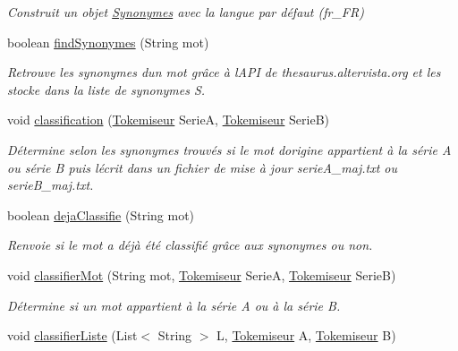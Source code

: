 \begin{DoxyCompactItemize}
\begin{DoxyCompactList}\small\item\em Construit un objet \hyperlink{classsynonymes_1_1_synonymes}{Synonymes} avec la langue par défaut (fr\+\_\+\+FR) \end{DoxyCompactList}\item 
boolean \hyperlink{classsynonymes_1_1_synonymes_aa0cc803aca4798d8bb630a1be78b4383}{find\+Synonymes} (String mot)
\begin{DoxyCompactList}\small\item\em Retrouve les synonymes d\textquotesingle{}un mot grâce à l\textquotesingle{}A\+PI de thesaurus.\+altervista.\+org et les stocke dans la liste de synonymes S. \end{DoxyCompactList}\item 
void \hyperlink{classsynonymes_1_1_synonymes_a5dec24ea9833290c26d844132c76e2e4}{classification} (\hyperlink{classtokemisation_1_1_tokemiseur}{Tokemiseur} SerieA, \hyperlink{classtokemisation_1_1_tokemiseur}{Tokemiseur} SerieB)
\begin{DoxyCompactList}\small\item\em Détermine selon les synonymes trouvés si le mot d\textquotesingle{}origine appartient à la série A ou série B puis l\textquotesingle{}écrit dans un fichier de mise à jour serie\+A\+\_\+maj.\+txt ou serie\+B\+\_\+maj.\+txt. \end{DoxyCompactList}\item 
boolean \hyperlink{classsynonymes_1_1_synonymes_a05d52b28c4d5366ea209a1083b7bd09d}{deja\+Classifie} (String mot)
\begin{DoxyCompactList}\small\item\em Renvoie si le mot a déjà été classifié grâce aux synonymes ou non. \end{DoxyCompactList}\item 
void \hyperlink{classsynonymes_1_1_synonymes_a4f2b7af65c0813bb1f6aff33ffd2959a}{classifier\+Mot} (String mot, \hyperlink{classtokemisation_1_1_tokemiseur}{Tokemiseur} SerieA, \hyperlink{classtokemisation_1_1_tokemiseur}{Tokemiseur} SerieB)
\begin{DoxyCompactList}\small\item\em Détermine si un mot appartient à la série A ou à la série B. \end{DoxyCompactList}\item 
void \hyperlink{classsynonymes_1_1_synonymes_ae02a51cbefd377553f2a29b8546afdf2}{classifier\+Liste} (List$<$ String $>$ L, \hyperlink{classtokemisation_1_1_tokemiseur}{Tokemiseur} A, \hyperlink{classtokemisation_1_1_tokemiseur}{Tokemiseur} B)

\end{DoxyCompactItemize}

